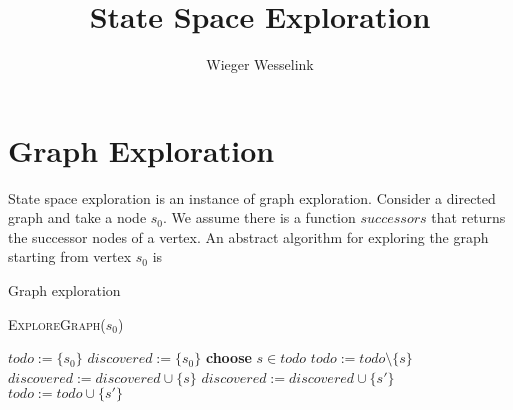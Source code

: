 \documentclass{article}
\title{State Space Exploration}
\author{Wieger Wesselink}
\begin{document}
\maketitle

\section{Graph Exploration}

State space exploration is an instance of graph exploration. Consider a directed graph
and take a node $s_0$. We assume there is a function $successors$ that returns the successor
nodes of a vertex. An abstract algorithm for exploring the graph starting from vertex
$s_0$ is

\begin{algorithm}
\small
\caption{Graph exploration}
\vspace*{1ex}
\textsc{ExploreGraph}($s_0$)
\begin{algorithmic}[1]
\State $todo := \{ s_0 \}$
\State $discovered := \{ s_0 \}$
  \State \textbf{choose} $s \in todo$
  \State $todo := todo \setminus \{s\}$
  \State $discovered := discovered \cup \{s\}$
      \State $discovered := discovered \cup \{s' \}$
      \State $todo := todo \cup \{ s' \}$
    \EndIf
  \EndFor
\EndWhile
\end{algorithmic}
\end{algorithm}

\end{document}
